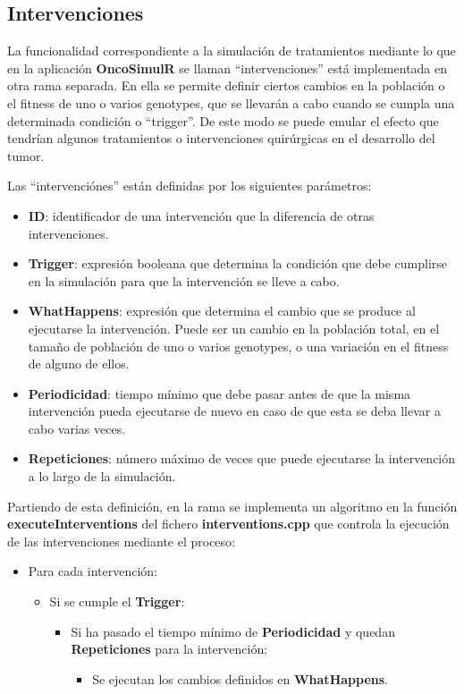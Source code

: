 \subsection{Intervenciones}\label{2.2.2}
La funcionalidad correspondiente a la simulación de tratamientos mediante lo que en la aplicación \textbf{OncoSimulR} se llaman ``intervenciones'' está implementada en otra rama separada\cite{Javier}. En ella se permite definir ciertos cambios en la población o el \gls{fitness} de uno o varios \glspl{genotype}, que se llevarán a cabo cuando se cumpla una determinada condición o ``trigger''. De este modo se puede emular el efecto que tendrían algunos tratamientos o intervenciones quirúrgicas en el desarrollo del \gls{tumor}.

Las ``intervenciónes'' están definidas por los siguientes parámetros:
\begin{itemize}
	\item \textbf{ID}: identificador de una intervención que la diferencia de otras intervenciones.
	\item \textbf{Trigger}: expresión booleana que determina la condición que debe cumplirse en la simulación para que la intervención se lleve a cabo.
	\item \textbf{WhatHappens}: expresión que determina el cambio que se produce al ejecutarse la intervención. Puede ser un cambio en la población total, en el tamaño de población de uno o varios \glspl{genotype}, o una variación en el \gls{fitness} de alguno de ellos.
	\item \textbf{Periodicidad}: tiempo mínimo que debe pasar antes de que la misma intervención pueda ejecutarse de nuevo en caso de que esta se deba llevar a cabo varias veces.
	\item \textbf{Repeticiones}: número máximo de veces que puede ejecutarse la intervención a lo largo de la simulación.
\end{itemize}

Partiendo de esta definición, en la rama se implementa un algoritmo en la función \textbf{executeInterventions} del fichero \textbf{interventions.cpp} que controla la ejecución de las intervenciones mediante el proceso:
\begin{itemize}
	\item Para cada intervención: 
	\begin{itemize}
		\item Si se cumple el \textbf{Trigger}:
		\begin{itemize}
			\item Si ha pasado el tiempo mínimo de \textbf{Periodicidad} y quedan \textbf{Repeticiones} para la intervención:
				\begin{itemize}
					\item Se ejecutan los cambios definidos en \textbf{WhatHappens}.
				\end{itemize}
		\end{itemize}
	\end{itemize}
\end{itemize}

